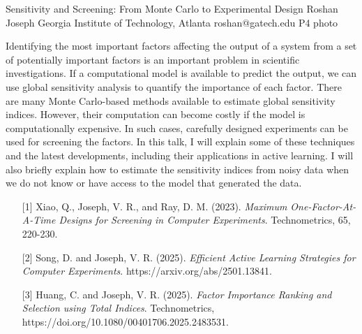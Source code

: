 \begin{talk}
  {Sensitivity and Screening: From Monte Carlo to Experimental Design}%
  {Roshan Joseph}%
  {Georgia Institute of Technology, Atlanta}%
  {roshan@gatech.edu}%
  {}%
  {}%
  {}%
  {P4}%
  {photo}%
			
Identifying the most important factors affecting the output of a system from a set of potentially important factors is an important problem in scientific investigations. If a computational model is available to predict the output, we can use global sensitivity analysis to quantify the importance of each factor. There are many Monte Carlo-based methods available to estimate global sensitivity indices. However, their computation can become costly if the model is computationally expensive. In such cases, carefully designed experiments can be used for screening the factors. In this talk, I will explain some of these techniques and the latest developments, including their applications in active learning. I will also briefly explain how to estimate the sensitivity indices from noisy data when we do not know or have access to the model that generated the data.
\medskip

\begin{enumerate}
	\item[{[1]}] Xiao, Q., Joseph, V. R., and Ray, D. M. (2023). {\it Maximum One-Factor-At-A-Time  Designs for Screening in Computer Experiments}. Technometrics, 65, 220-230.
    \item[{[2]}] Song, D. and Joseph, V. R. (2025). {\it Efficient Active Learning Strategies for Computer Experiments}. https://arxiv.org/abs/2501.13841.
	\item[{[3]}] Huang, C. and Joseph, V. R. (2025). {\it Factor Importance Ranking and Selection using Total Indices}. Technometrics, https://doi.org/10.1080/00401706.2025.2483531.
\end{enumerate}

\end{talk}

\clearpage

